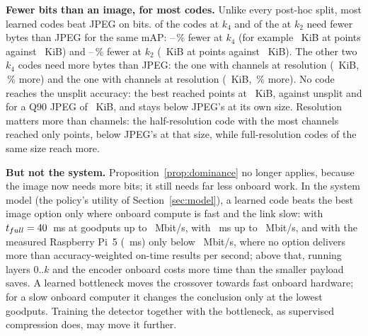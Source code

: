 \documentclass[journal,twocolumn,10pt]{IEEEtran}
\begin{document}
\textbf{Fewer bits than an image, for most codes.} Unlike every post-hoc split, most learned codes beat JPEG on bits.
\LbKFourWinN{} of the \LbKFourN{} codes at $k_4$ and \LbKTwoWinN{} of the \LbKTwoN{} at $k_2$ need fewer bytes than JPEG
for the same mAP: \LbKFourSavingMin--\LbKFourSavingMax\,\% fewer at $k_4$ (for example \LbKFourExBytes~KiB at
\LbKFourExMap{} points against \LbKFourExJpegBytes~KiB) and \LbKTwoSavingMin--\LbKTwoSavingMax\,\% fewer at $k_2$
(\LbKTwoExBytes~KiB at \LbKTwoExMap{} points against \LbKTwoExJpegBytes~KiB). The other two $k_4$ codes need more bytes
than JPEG: the one with \LbKFourLoseOneCh{} channels at \LbKFourLoseOneRes{} resolution (\LbKFourLoseOneBytes~KiB,
\LbKFourLoseOneExtraPct\,\% more) and the one with \LbKFourLoseTwoCh{} channels at \LbKFourLoseTwoRes{} resolution
(\LbKFourLoseTwoBytes~KiB, \LbKFourLoseTwoExtraPct\,\% more). No code reaches the unsplit accuracy: the best reached
\LbMaxMap{} points at \LbMaxBytes~KiB, against \LbBaseMap{} unsplit and \LbJpegNinetyMap{} for a Q90 JPEG of
\LbJpegNinetyBytes~KiB, and stays below JPEG's \LbMaxJpegMap{} at its own size. Resolution matters more than channels:
the half-resolution code with the most channels reached only \LbKFourLoseOneMap{} points, below JPEG's
\LbKFourLoseOneJpegMap{} at that size, while full-resolution codes of the same size reach more.

\textbf{But not the system.} Proposition~\ref{prop:dominance} no longer applies, because the image now needs more bits;
it still needs far less onboard work. In the system model (the policy's utility of Section~\ref{sec:model}), a learned
code beats the best image option only where onboard compute is fast and the link slow: with $t_{full}=40$~ms at
goodputs up to \LbFastGoodput~Mbit/s, with \LbSlowMs~ms up to \LbSlowGoodput~Mbit/s, and with the measured Raspberry
Pi~5 (\LbPiMs~ms) only below \LbPiGoodput~Mbit/s, where no option delivers more than \LbPiUtilMax{} accuracy-weighted
on-time results per second; above that, running layers $0..k$ and the encoder onboard costs more time than the smaller
payload saves. A learned bottleneck moves the crossover towards fast onboard hardware; for
a slow onboard computer it changes the conclusion only at the lowest goodputs. Training the detector together with the bottleneck, as
supervised compression does, may move it further.


\end{document}
